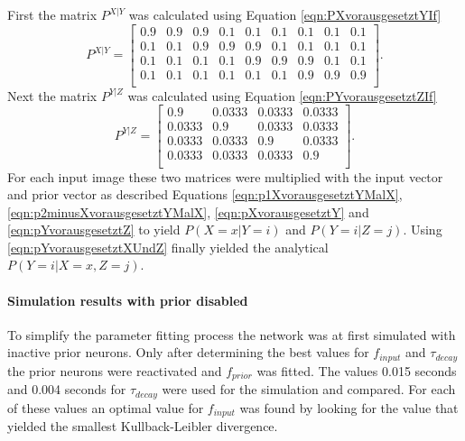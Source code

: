 First the matrix $P^{X|Y}$ was calculated using Equation \ref{eqn:PXvorausgesetztYIf} 
\begin{equation}
\label{eqn:pXvorausgesetztYResult}
P^{X|Y} = \begin{bmatrix}
0.9 & 0.9 & 0.9 & 0.1 & 0.1 & 0.1 & 0.1 & 0.1 & 0.1\\
0.1 & 0.1 & 0.9 & 0.9 & 0.9 & 0.1 & 0.1 & 0.1 & 0.1\\
0.1 & 0.1 & 0.1 & 0.1 & 0.9 & 0.9 & 0.9 & 0.1 & 0.1\\
0.1 & 0.1 & 0.1 & 0.1 & 0.1 & 0.1 & 0.9 & 0.9 & 0.9\\
\end{bmatrix}.
\end{equation}
Next the matrix $P^{Y|Z}$ was calculated using Equation \ref{eqn:PYvorausgesetztZIf} 
\begin{equation}
\label{eqn:pYvorausgesetztZResult}
P^{Y|Z} = \begin{bmatrix}
0.9 & 0.0333 & 0.0333 & 0.0333\\
0.0333 & 0.9 & 0.0333 & 0.0333\\
0.0333 & 0.0333 & 0.9 & 0.0333\\
0.0333 & 0.0333 & 0.0333 & 0.9\\
\end{bmatrix}.
\end{equation} 
For each input image these two matrices were multiplied with the input vector and prior vector as described Equations \ref{eqn:p1XvorausgesetztYMalX}, \ref{eqn:p2minusXvorausgesetztYMalX},  \ref{eqn:pXvorausgesetztY} and \ref{eqn:pYvorausgesetztZ} to yield $P(X = x|Y = i)$ and $P(Y=i|Z=j)$. Using \ref{eqn:pYvorausgesetztXUndZ}  finally yielded the analytical $P(Y = i|X = x, Z = j)$.

\paragraph{Simulation results with prior disabled}
To simplify the parameter fitting process the network was at first simulated with inactive prior neurons. Only after determining the best values for $f_{input}$ and $\tau_{decay}$ the prior neurons were reactivated and $f_{prior}$ was fitted. The values 0.015 seconds and 0.004 seconds for $\tau_{decay}$ were used for the simulation and compared. For each of these values an optimal value for $f_{input}$ was found by looking for the value that yielded the smallest Kullback-Leibler divergence.

